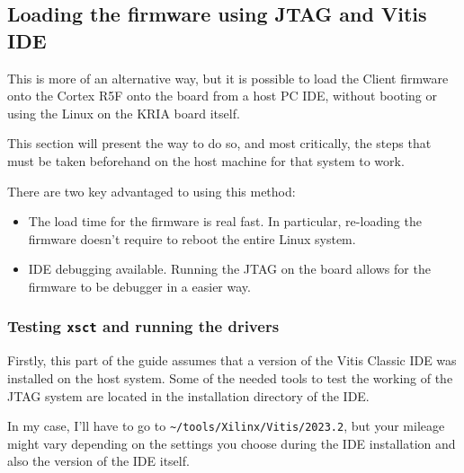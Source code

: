 \documentclass[10pt]{article}
\begin{document}
\clearpage
\subsection{Loading the firmware using JTAG and Vitis IDE}
\label{sec:orgcd2c844}
This is more of an alternative way, but it is possible to load the Client
firmware onto the Cortex R5F onto the board from a host PC IDE, without booting or
using the Linux on the KRIA board itself.

This section will present the way to do so, and most critically, the steps that must
be taken beforehand on the host machine for that system to work.

There are two key advantaged to using this method:
\begin{itemize}
\item The load time for the firmware is real fast. In particular, re-loading the
firmware doesn't require to reboot the entire Linux system.
\item IDE debugging available. Running the JTAG on the board allows for the firmware
to be debugger in a easier way.
\end{itemize}

\subsubsection{Testing \texttt{xsct} and running the drivers}
\label{sec:org4a8883c}
Firstly, this part of the guide assumes that a version of the Vitis Classic IDE
was installed on the host system. Some of the needed tools to test the working of the JTAG
system are located in the installation directory of the IDE.

In my case, I'll have to go to \texttt{\textasciitilde{}/tools/Xilinx/Vitis/2023.2}, but your mileage might vary
depending on the settings you choose during the IDE installation and also the version of
the IDE itself.
\end{document}
